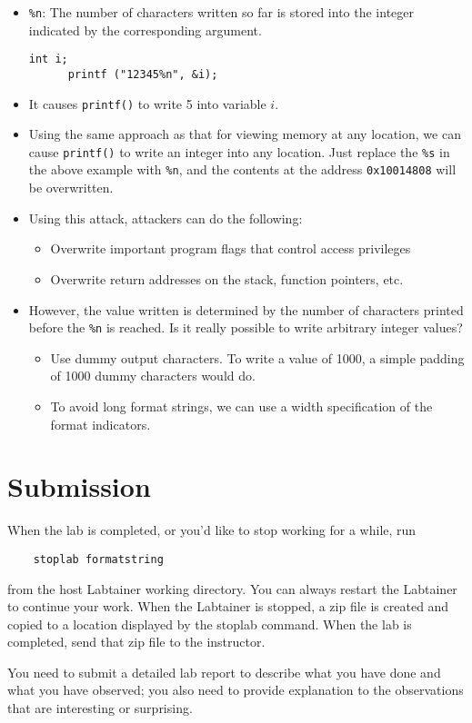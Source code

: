    \begin{itemize}
   \item {\tt \%n}: The number of characters written so far is stored into the
   integer indicated by the corresponding argument.
   \begin{Verbatim}[frame=single]
      int i;
      printf ("12345%n", &i);
   \end{Verbatim}
   \item It causes {\tt printf()} to write 5 into variable $i$.

   \item Using the same approach as that for viewing memory at any location, we
   can cause {\tt printf()} to write an integer into any location. Just replace
   the \verb|%s| in the above example with \verb|%n|, and the contents at the
   address \verb|0x10014808| will be overwritten.

   \item Using this attack, attackers can do the following:
       \begin{itemize}
       \item Overwrite important program flags that control access privileges
       \item Overwrite return addresses on the stack, function pointers, etc.
       \end{itemize}

   \item However, the value written is determined by the number of characters
   printed before the {\tt \%n} is reached. Is it really possible to write
   arbitrary integer values?
       \begin{itemize}
       \item Use dummy output characters. To write a value of 1000, a simple
       padding of 1000 dummy characters would do.
       \item To avoid long format strings, we can use a width specification of
       the format indicators.
       \end{itemize}
   \end{itemize}







\section{Submission}
When the lab is completed, or you'd like to stop working for a while, run
\begin{verbatim}
    stoplab formatstring
\end{verbatim}

from the host Labtainer working directory.  You can always restart the
Labtainer to continue your work.  When the Labtainer is stopped, a
zip file is created and copied to a location displayed by the stoplab
command.  When the lab is completed, send that zip file to the instructor.

You need to submit a detailed lab report to describe what you have
done and what you have observed; you also need to provide explanation
to the observations that are interesting or surprising.


